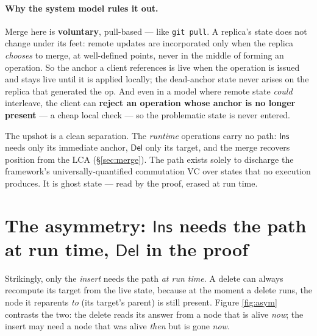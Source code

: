 \documentclass[11pt]{article}
\newcommand{\Ins}{\mathsf{Ins}}
\newcommand{\Del}{\mathsf{Del}}
\begin{document}
\paragraph{Why the system model rules it out.} Merge here is \textbf{voluntary},
pull-based --- like \texttt{git pull}. A replica's state does not change under its
feet: remote updates are incorporated only when the replica \emph{chooses} to
merge, at well-defined points, never in the middle of forming an operation. So the
anchor a client references is live when the operation is issued and stays live
until it is applied locally; the dead-anchor state never arises on the replica that
generated the op. And even in a model where remote state \emph{could} interleave,
the client can \textbf{reject an operation whose anchor is no longer present} --- a
cheap local check --- so the problematic state is never entered.

The upshot is a clean separation. The \emph{runtime} operations carry no path:
$\Ins$ needs only its immediate anchor, $\Del$ only its target, and the merge
recovers position from the LCA (\S\ref{sec:merge}). The path exists solely to
discharge the framework's universally-quantified commutation VC over states that no
execution produces. It is ghost state --- read by the proof, erased at run time.

\section{The asymmetry: $\Ins$ needs the path at run time, $\Del$ in the proof}
\label{sec:asym}

Strikingly, only the \emph{insert} needs the path \emph{at run time}. A delete can
always recompute its target from the live state, because at the moment a delete
runs, the node it reparents \emph{to} (its target's parent) is still present. Figure
\ref{fig:asym} contrasts the two: the delete reads its answer from a node that is
alive \emph{now}; the insert may need a node that was alive \emph{then} but is
gone \emph{now}.
\end{document}
